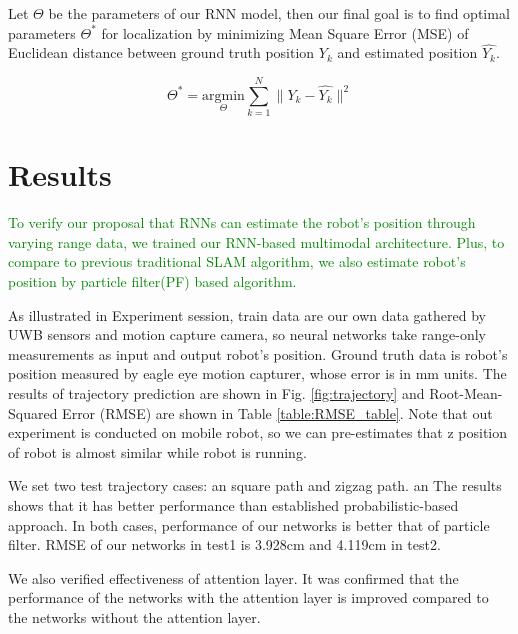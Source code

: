 \documentclass[letterpaper, 10 pt, conference]{ieeeconf}  %
\begin{document}
Let $\Theta$ be the parameters of our RNN model, then our final goal is to find optimal parameters $\Theta^{*}$ for localization by minimizing Mean Square Error (MSE) of Euclidean distance between ground truth position $Y_k$ and estimated position $\hat{Y_k}$.

\begin{equation}
\Theta^{*} = \underset{\Theta}{\mathrm{argmin}} \sum_{k=1}^N \parallel Y_k - \hat{Y_k} \parallel^{2}
\end{equation}  

\section{Results}

 \textcolor{green}{To verify our proposal that RNNs can estimate the robot's position through varying range data, we trained our RNN-based multimodal architecture. Plus, to compare to previous traditional SLAM algorithm, we also estimate robot's position by particle filter(PF) based algorithm.}

 As illustrated in Experiment session, train data are our own data gathered by UWB sensors and motion capture camera, so neural networks take range-only measurements as input and output robot's position. Ground truth data is robot's position measured by eagle eye motion capturer, whose error is in mm units. The results of trajectory prediction are shown in Fig. \ref{fig:trajectory} and Root-Mean-Squared Error (RMSE) are shown in Table \ref{table:RMSE_table}. Note that out experiment is conducted on mobile robot, so we can pre-estimates that z position of robot is almost similar while robot is running. 

 We set two test trajectory cases: an square path and zigzag path. an The results shows that it has better performance than established probabilistic-based approach. In both cases, performance of our networks  is better that of particle filter. RMSE of our networks in test1 is 3.928cm and 4.119cm in test2.
 
 We also verified effectiveness of attention layer. It was confirmed that the performance of the networks with the attention layer is improved compared to the networks without the attention layer.
  
\end{document}
